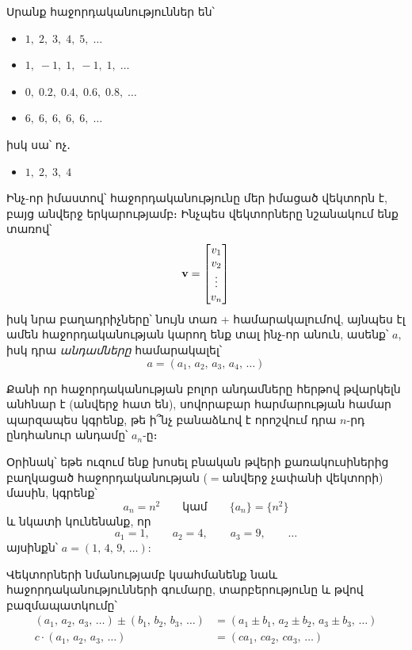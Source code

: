 \begin{example}
Սրանք հաջորդականություններ են՝
\begin{itemize}
    \item $1,\; 2,\; 3,\; 4,\; 5,\; \dots$
    \item $1,\; -1,\; 1,\; -1,\; 1,\; \dots$
    \item $0,\; 0.2,\; 0.4,\; 0.6,\; 0.8,\; \dots$
    \item $6,\; 6,\; 6,\; 6,\; 6,\;  \dots$
\end{itemize}
իսկ սա՝ ոչ․
\begin{itemize}
    \item $1,\; 2,\; 3,\; 4$
\end{itemize}
\end{example}


Ինչ-որ իմաստով՝ հաջորդականությունը մեր իմացած վեկտորն է, բայց անվերջ երկարությամբ։ Ինչպես վեկտորները նշանակում ենք տառով՝
\[
\mathbf{v} = \begin{bmatrix}
    v_1 \\ v_2 \\ \vdots \\ v_n
\end{bmatrix}
\]
իսկ նրա բաղադրիչները՝ նույն տառ + համարակալումով, այնպես էլ ամեն հաջորդականության կարող ենք տալ ինչ-որ անուն, ասենք՝ $a$, իսկ դրա \textit{անդամները} համարակալել՝
\[
a = (a_1,\, a_2,\, a_3,\, a_4,\, \dots )
\]

Քանի որ հաջորդականության բոլոր անդամները հերթով թվարկելն անհնար է (անվերջ հատ են), սովորաբար հարմարության համար պարզապես կգրենք, թե ի՞նչ բանաձևով է որոշվում դրա $n$-րդ ընդհանուր անդամը՝ $a_n$-ը։ 

Օրինակ՝ եթե ուզում ենք խոսել բնական թվերի քառակուսիներից բաղկացած հաջորդականության ($=$անվերջ չափանի վեկտորի) մասին, կգրենք՝
\[
a_n = n^2 \qquad \text{կամ} \qquad \{a_n\}=\{n^2\}
\]
և նկատի կունենանք, որ
\[
a_1 = 1, \qquad a_2 = 4, \qquad a_3 = 9, \qquad \dots 
\]
այսինքն՝ $a = (1,\, 4,\, 9,\, \dots)$:


Վեկտորների նմանությամբ կսահմանենք նաև հաջորդականությունների գումարը, տարբերությունը և թվով բազմապատկումը՝
\begin{align*}
(a_1,\, a_2,\, a_3,\, \dots) 
\pm
(b_1,\, b_2,\, b_3,\, \dots) 
&=
(a_1\pm b_1,\, a_2\pm b_2,\, a_3\pm b_3,\, \dots)%
\\
c \cdot 
(a_1,\, a_2,\, a_3,\, \dots) 
&=
(ca_1,\, ca_2,\, ca_3,\, \dots)%
\end{align*}

